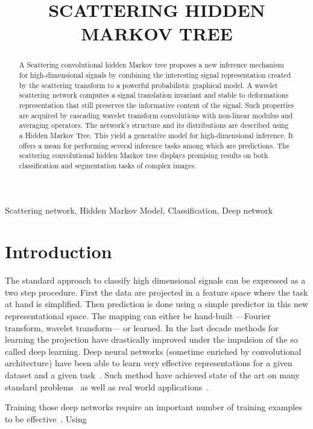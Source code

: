 \documentclass{article}
\title{SCATTERING HIDDEN MARKOV TREE}
\begin{document}
%
\maketitle
%
\begin{abstract}
  A Scattering convolutional hidden Markov tree proposes a new inference mechanism for high-dimensional signals by combining the interesting signal representation created by the scattering transform to a powerful probabilistic graphical model.
  A wavelet scattering network computes a signal translation invariant and stable to deformations representation that still preserves the informative content of the signal. Such properties are acquired by cascading wavelet transform convolutions with non-linear modulus and averaging operators.
  The network's structure and its distributions are described using a Hidden Markov Tree. This yield a generative model for high-dimensional inference. It offers a mean for performing several inference tasks among which are predictions. The scattering convolutional hidden Markov tree displays promising results on both classification and segmentation tasks of complex images.
\end{abstract}
%
\begin{keywords}
  Scattering network, Hidden Markov Model, Classification, Deep network
\end{keywords}
%
\section{Introduction}
\label{sec:Intro}

  The standard approach to classify high dimensional signals can be expressed as a two step procedure. First the data are projected in a feature space where the task at hand is simplified. Then prediction is done using a simple predictor in this new representational space. The mapping can either be hand-built ---\eg Fourier transform, wavelet transform--- or learned. In the last decade methods for learning the projection have drastically improved under the impulsion of the so called deep learning. Deep neural networks (sometime enriched by convolutional architecture) have been able to learn very effective representations for a given dataset and a given task~\citep{DNN, CNN}. Such method have achieved state of the art on many standard problems~\citep{alexNet} as well as real world applications~\citep{microsoft cortana}. 
  
  Training those deep networks require an important number of training examples to be effective~\citep{training example in DNN}. Using    
  ~\citep{one shot learning }
    
\end{document}
